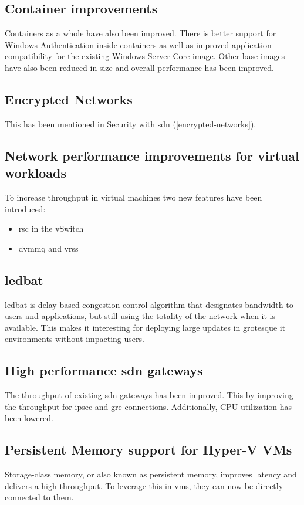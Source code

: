 \subsection*{Container improvements}
Containers as a whole have also been improved. There is better support for Windows Authentication inside containers as well as improved application compatibility for the existing Windows Server Core image. Other base images have also been reduced in size and overall performance has been improved.
\subsection*{Encrypted Networks}
This has been mentioned in Security with \acrlong{sdn} (\ref{encrypted-networks}).
\subsection*{Network performance improvements for virtual workloads}
To increase throughput in virtual machines two new features have been introduced:
\begin{itemize}
	\item \acrfull{rsc} in the vSwitch
	\item \acrfull{dvmmq} and \acrfull{vrss}
\end{itemize}
\subsection*{\acrfull{ledbat}}
\acrshort{ledbat} is delay-based congestion control algorithm that designates bandwidth to users and applications, but still using the totality of the network when it is available. \autocite{Shalunov2012}
This makes it interesting for deploying large updates in grotesque \acrshort{it} environments without impacting users.
\subsection*{High performance \acrshort{sdn} gateways}
The throughput of existing \acrshort{sdn} gateways has been improved. This by improving the throughput for \acrfull{ipsec} and \acrfull{gre} connections. Additionally, CPU utilization has been lowered.
\subsection*{Persistent Memory support for Hyper-V VMs}
Storage-class memory, or also known as persistent memory, improves latency and delivers a high throughput. To leverage this in \acrshort{vm}s, they can now be directly connected to them.
